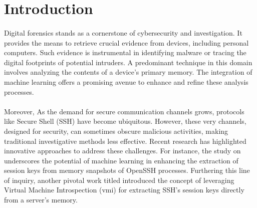 \section{Introduction}\label{chap:introduction}

\begin{comment}
Motivate your research and outline the research gap in this chapter. Why is your thesis relevant and what do you address, what has not been addressed before. 

General Requirements to the thesis:

\begin{itemize}
	\item 60 pages of content in this format. Content does not include table of content, lists, appendices etc.
	\item Proper scientific referencing
	\item Introduction and Background should be less than 50\% of the thesis
	\item Images should be readable and in the proper size. 
\end{itemize}
\end{comment}

\paragraph*{}Digital forensics stands as a cornerstone of cybersecurity and investigation. It provides the means to retrieve crucial evidence from devices, including personal computers. Such evidence is instrumental in identifying malware or tracing the digital footprints of potential intruders. A predominant technique in this domain involves analyzing the contents of a device's primary memory. The integration of machine learning offers a promising avenue to enhance and refine these analysis processes.
\paragraph*{}Moreover, As the demand for secure communication channels grows, protocols like Secure Shell (SSH) have become ubiquitous. However, these very channels, designed for security, can sometimes obscure malicious activities, making traditional investigative methods less effective. Recent research has highlighted innovative approaches to address these challenges. For instance, the study on  underscores the potential of machine learning in enhancing the extraction of session keys from memory snapshots of OpenSSH processes. Furthering this line of inquiry, another pivotal work titled  introduced the concept of leveraging Virtual Machine Introspection (\acrshort{vmi}) for extracting SSH's session keys directly from a server's memory. 

